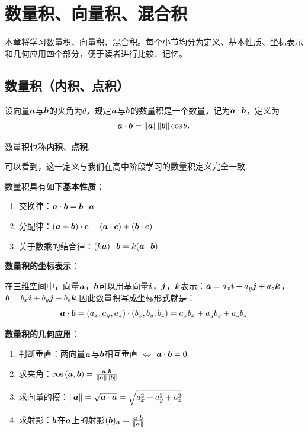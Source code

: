 \chapter{数量积、向量积、混合积}

本章将学习数量积、向量积、混合积。每个小节均分为定义、基本性质、坐标表示和几何应用四个部分，便于读者进行比较、记忆。

\section{数量积（内积、点积）}
\begin{definition}[数量积]
  设向量$\vb*{a}$与$\vb*{b}$的夹角为$\theta$，规定$\vb*{a}$与$\vb*{b}$的数量积是一个数量，记为$\vb*{a} \cdot \vb*{b}$，定义为
  \begin{equation}
    \vb*{a} \cdot \vb*{b} = \| \vb*{a} \| \| \vb*{b} \| \cos{\theta}.
  \end{equation}
\end{definition}
\par 数量积也称\textbf{内积}、\textbf{点积}.
\par 可以看到，这一定义与我们在高中阶段学习的数量积定义完全一致.

\par 数量积具有如下\textbf{基本性质}：
\begin{enumerate}
  \item 交换律：$\vb*{a} \cdot \vb*{b} = \vb*{b} \cdot \vb*{a}$
  \item 分配律：$(\vb*{a}+\vb*{b}) \cdot \vb*{c} = (\vb*{a} \cdot \vb*{c})+ (\vb*{b} \cdot \vb*{c})$
  \item 关于数乘的结合律：$(k\vb*{a}) \cdot \vb*{b} = k(\vb*{a} \cdot \vb*{b})$
\end{enumerate}

\par \textbf{数量积的坐标表示}：
\par 在三维空间中，向量$\vb*{a}$，$\vb*{b}$可以用基向量$\vb*{i}$，$\vb*{j}$，$\vb*{k}$表示：$\vb*{a}=a_x\vb*{i}+a_y\vb*{j}+a_z\vb*{k}$，$\vb*{b}=b_x\vb*{i}+b_y\vb*{j}+b_z\vb*{k}$.因此数量积写成坐标形式就是：
\begin{equation}
  \vb*{a} \cdot \vb*{b} = (a_x,a_y,a_z) \cdot (b_x,b_y,b_z) = a_x b_x + a_y b_y + a_z b_z
\end{equation}

\par \textbf{数量积的几何应用}：
\begin{enumerate}
  \item 判断垂直：两向量$\vb*{a}$与$\vb*{b}$相互垂直 $\Leftrightarrow$ $\vb*{a} \cdot \vb*{b}=0$
  \item 求夹角：$\cos{(\vb*{a},\vb*{b})}=\frac{\vb*{a} \cdot \vb*{b}}{\| \vb*{a} \| \| \vb*{b} \|}$
  \item 求向量的模：$\| \vb*{a} \|=\sqrt{\vb*{a} \cdot \vb*{a}}=\sqrt{a_x^2+a_y^2+a_z^2}$
  \item 求射影：$\vb*{b}$在$\vb*{a}$上的射影$(\vb*{b})_{\vb*{a}}=\frac{\vb*{a} \cdot \vb*{b} }{ \| \vb*{a} \|}$
\end{enumerate}

